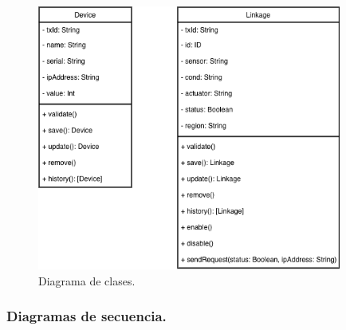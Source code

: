 \begin{figure}[h!]
    \centering
    \includegraphics[width=10cm]{imagenes/diagramas/diagrama_clases}
    \caption{Diagrama de clases.}
    \label{fig:diagrama-de-clases}
\end{figure}

\subsubsection{Diagramas de secuencia.}

